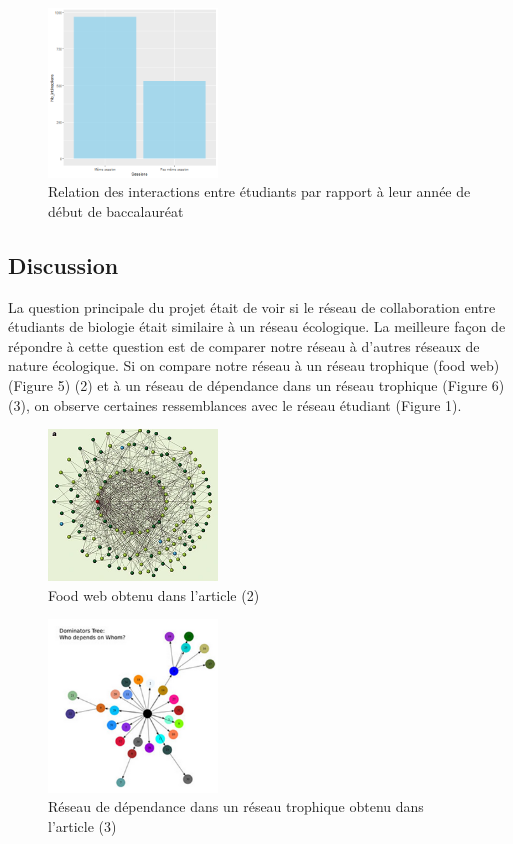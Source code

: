 \documentclass[9pt,twocolumn,twoside,]{pnas-new}
\begin{document}
\begin{figure}
\centering
\includegraphics[width=0.4\textwidth,height=0.3\textheight]{"../annee.png"}
\caption{Relation des interactions entre étudiants par rapport à leur
année de début de baccalauréat}
\end{figure}

\hypertarget{discussion}{%
\subsection{Discussion}\label{discussion}}

La question principale du projet était de voir si le réseau de
collaboration entre étudiants de biologie était similaire à un réseau
écologique. La meilleure façon de répondre à cette question est de
comparer notre réseau à d'autres réseaux de nature écologique. Si on
compare notre réseau à un réseau trophique (food web) (Figure 5) (2) et
à un réseau de dépendance dans un réseau trophique (Figure 6) (3), on
observe certaines ressemblances avec le réseau étudiant (Figure 1).

\begin{figure}
\centering
\includegraphics[width=0.4\textwidth,height=0.3\textheight]{"../inter_gros.png"}
\caption{Food web obtenu dans l'article (2)}
\end{figure}

\begin{figure}
\centering
\includegraphics[width=0.4\textwidth,height=0.3\textheight]{"../inter_petit.png"}
\caption{Réseau de dépendance dans un réseau trophique obtenu dans
l'article (3)}
\end{figure}
\end{document}
